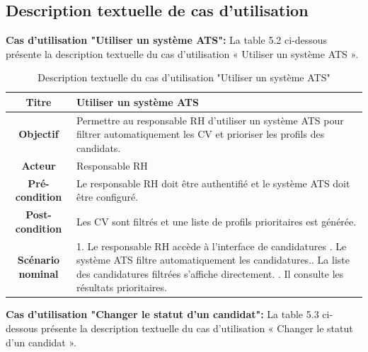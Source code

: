 \subsection{Description textuelle de cas d'utilisation}

     \item \textbf{Cas d'utilisation "Utiliser un système ATS": } La table 5.2 ci-dessous présente la description textuelle du cas d'utilisation « Utiliser un système ATS ».

 \begin{table}[H]
 \caption{ Description textuelle du cas d’utilisation "Utiliser un système ATS"}
    \centering
    \begin{tabular}{|c|p{12cm}|}
    \hline
    \textbf{Titre} & Utiliser un système ATS \\
    \hline
    \textbf{Objectif} & Permettre au responsable RH d’utiliser un système ATS pour filtrer automatiquement les CV et prioriser les profils des candidats. \\
    \hline
    \textbf{Acteur}& Responsable RH\\
    \hline
    \textbf{Pré-condition} & Le responsable RH doit être authentifié et le système ATS doit être configuré.
    \\
    \hline
    \textbf{Post-condition} & Les CV sont filtrés et une liste de profils prioritaires est générée.\\
    \hline
    \textbf{Scénario nominal} & 1. Le responsable RH accède à l’interface de candidatures \newline
    2. Le système ATS filtre automatiquement les candidatures.\newline
    3. La liste des candidatures filtrées s’affiche directement.
    \newline
    4. Il consulte les résultats prioritaires.\\
    \hline
    \end{tabular}
    \label{tab:user_stories}
\end{table}


     \item \textbf{Cas d'utilisation "Changer le statut d'un candidat": } La table 5.3 ci-dessous présente la description textuelle du cas d'utilisation « Changer le statut d'un candidat ».


